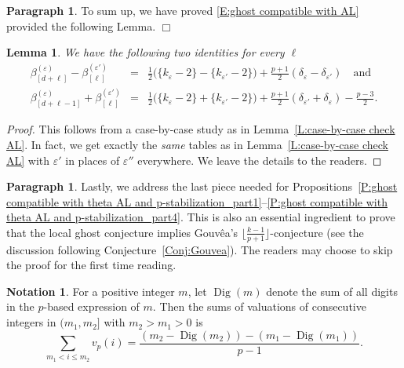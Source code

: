 \documentclass[12pt]{amsart}
\newtheorem{lemma}[subsection]{Lemma}
\theoremstyle{definition}
\newtheorem{notation}[subsection]{Notation}
\newtheorem{para}[subsection]{Paragraph}
\numberwithin{equation}{subsection}
\DeclareMathOperator{\Dig}{Dig}
\begin{document}
\begin{para}
\label{P:para_147}
To sum up, we have proved \eqref{E:ghost compatible with AL} provided the following Lemma. \hfill $\Box$
\end{para}

\begin{lemma}
\label{L:case-by-case check theta}
We have the following two identities for every $\ell$
\begin{eqnarray*}
\beta_{[d+\ell]}^{(\varepsilon)} - \beta_{[\ell]}^{(\varepsilon')} &=&  \tfrac 12\big(\{k _\varepsilon -2\} - \{k_{\varepsilon '}-2\}\big)+\tfrac{p+1}2( \delta_\varepsilon-\delta_{\varepsilon'})  \quad\textrm{and}
\\
\beta_{[d+\ell-1]}^{(\varepsilon)}+\beta_{[\ell]}^{(\varepsilon')}
&=&
\tfrac12\big(\{k_\varepsilon-2\} +\{k_{\varepsilon'}  - 2\}\big) + \tfrac{p+1}2(\delta_{\varepsilon'} + \delta_\varepsilon)-\tfrac{p-3}2.
\end{eqnarray*}
\end{lemma}
\begin{proof}
This follows from a case-by-case study as in Lemma~\ref{L:case-by-case check AL}. In fact, we get exactly the \emph{same} tables as in Lemma~\ref{L:case-by-case check AL} with $\varepsilon'$ in places of $\varepsilon''$ everywhere. We leave the details to the readers.
\end{proof}

\begin{para}
\label{P:para_148}
Lastly, we address the last piece needed for Propositions~\ref{P:ghost compatible with theta AL and p-stabilization_part1}--\ref{P:ghost compatible with theta AL and p-stabilization_part4}. This is also an essential ingredient to prove that the local ghost conjecture implies Gouv\^ea's $\lfloor\frac{k-1}{p+1}\rfloor$-conjecture (see the discussion following Conjecture~\ref{Conj:Gouvea}). The readers may choose to skip  the proof for the first time reading.
\end{para}

\begin{notation}
For a positive integer $m$, let $\Dig(m)$ denote the sum of all digits in the $p$-based expression of $m$. Then the sums of valuations of consecutive integers in $(m_1, m_2]$ with $m_2 > m_1>0$ is
\begin{equation}
\label{E:sum of consecutive valuations}
\sum_{m_1< i \leq m_2} v_p(i) = \frac{(m_2-\Dig(m_2) )-(m_1 -\Dig(m_1))} {p-1}.
\end{equation}

\end{notation}
\end{document}
